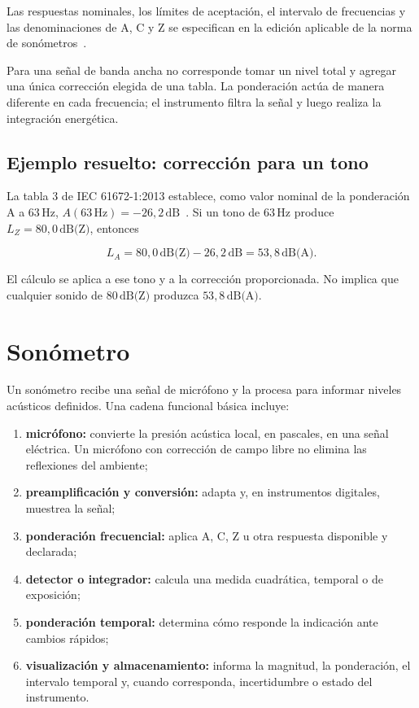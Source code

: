 Las respuestas nominales, los límites de aceptación, el intervalo de
frecuencias y las denominaciones de A, C y Z se especifican en la edición
aplicable de la norma de sonómetros~\cite{iec61672_1_2013}.

Para una señal de banda ancha no corresponde tomar un nivel total y agregar
una única corrección elegida de una tabla. La ponderación actúa de manera
diferente en cada frecuencia; el instrumento filtra la señal y luego realiza
la integración energética.

\subsection{Ejemplo resuelto: corrección para un tono}
\label{sec:u5-ejemplo-ponderacion}

La tabla 3 de IEC 61672-1:2013 establece, como valor nominal de la
ponderación A a \(63\,\text{Hz}\),
\(A(63\,\text{Hz})=-26{,}2\,\text{dB}\)~\cite{iec61672_1_2013}. Si un tono de
\(63\,\text{Hz}\) produce \(L_Z=80{,}0\,\text{dB(Z)}\), entonces

\[
    L_A=80{,}0\,\text{dB(Z)}-26{,}2\,\text{dB}
       =53{,}8\,\text{dB(A)}.
\]

El cálculo se aplica a ese tono y a la corrección proporcionada. No implica
que cualquier sonido de \(80\,\text{dB(Z)}\) produzca
\(53{,}8\,\text{dB(A)}\).


\section{Sonómetro}
\label{sec:u5-sonometro}

Un sonómetro recibe una señal de micrófono y la procesa para informar niveles
acústicos definidos. Una cadena funcional básica incluye:

\begin{enumerate}
    \item \textbf{micrófono:} convierte la presión acústica local, en
    pascales, en una señal eléctrica. Un micrófono con corrección de campo
    libre no elimina las reflexiones del ambiente;
    \item \textbf{preamplificación y conversión:} adapta y, en instrumentos
    digitales, muestrea la señal;
    \item \textbf{ponderación frecuencial:} aplica A, C, Z u otra respuesta
    disponible y declarada;
    \item \textbf{detector o integrador:} calcula una medida cuadrática,
    temporal o de exposición;
    \item \textbf{ponderación temporal:} determina cómo responde la indicación
    ante cambios rápidos;
    \item \textbf{visualización y almacenamiento:} informa la magnitud, la
    ponderación, el intervalo temporal y, cuando corresponda, incertidumbre o
    estado del instrumento.
\end{enumerate}

